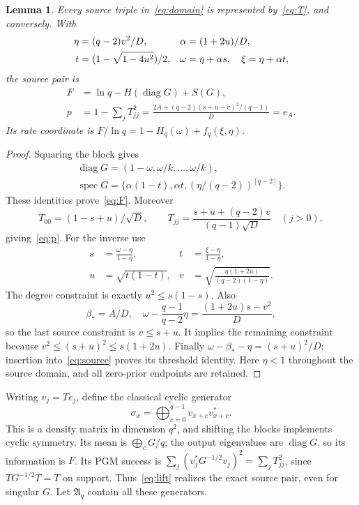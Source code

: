 \documentclass[12pt,letterpaper,onecolumn]{article}
\newtheorem{lemma}[theorem]{Lemma}
\theoremstyle{definition}
\theoremstyle{remark}
\DeclareMathOperator{\diag}{diag}
\DeclareMathOperator{\spec}{spec}
\begin{document}
\begin{lemma}\label{lem:source}
Every source triple in~\eqref{eq:domain} is represented by~\eqref{eq:T}, and conversely. With
\begin{align}
\eta&=(q-2)v^2/D,& \alpha&=(1+2u)/D,\notag\\
t&=(1-\sqrt{1-4u^2})/2,&
\omega&=\eta+\alpha s,\quad \xi=\eta+\alpha t,\label{eq:map}
\end{align}
the source pair is
\begin{align}
F&=\ln q-H(\diag G)+S(G),\label{eq:F}\\
p&=1-\sum_jT_{jj}^2
=\frac{2A+(q-2)(s+u-v)^2/(q-1)}D=e_A.\label{eq:p}
\end{align}
Its rate coordinate is \(F/\ln q=1-H_q(\omega)+f_q(\xi,\eta)\).
\end{lemma}
\begin{proof}
Squaring the block gives
\begin{gather*}
\diag G=(1-\omega,\omega/k,\ldots,\omega/k),\\
\spec G=\{\alpha(1-t),\alpha t,(\eta/(q-2))^{[q-2]}\}.
\end{gather*}
These identities prove~\eqref{eq:F}. Moreover
\[
T_{00}=(1-s+u)/\sqrt D,\qquad
T_{jj}=\frac{s+u+(q-2)v}{(q-1)\sqrt D}\quad(j>0),
\]
giving~\eqref{eq:p}. For the inverse use
\begin{align*}
s&=\frac{\omega-\eta}{1-\eta},&
t&=\frac{\xi-\eta}{1-\eta},\\
u&=\sqrt{t(1-t)},&
v&=\sqrt{\frac{\eta(1+2u)}{(q-2)(1-\eta)}}.
\end{align*}
The degree constraint is exactly \(u^2\le s(1-s)\).
Also
\[
\beta_*=A/D,\quad
\omega-\frac{q-1}{q-2}\eta=\frac{(1+2u)s-v^2}{D},
\]
so the last source constraint is \(v\le s+u\).
It implies the remaining constraint because
\(v^2\le(s+u)^2\le s(1+2u)\).
Finally \(\omega-\beta_*-\eta=(s+u)^2/D\); insertion into~\eqref{eq:source} proves its threshold identity. Here \(\eta<1\) throughout the source domain, and all zero-prior endpoints are retained.
\end{proof}

Writing \(v_j=Te_j\), define the classical cyclic generator
\begin{equation}\label{eq:lift}
\sigma_x=\bigoplus_{c=0}^{q-1}v_{x+c}v_{x+c}^*.
\end{equation}
This is a density matrix in dimension \(q^2\), and shifting the blocks implements cyclic symmetry. Its mean is \(\bigoplus_cG/q\); the output eigenvalues are \(\diag G\), so its information is \(F\). Its PGM success is
\(\sum_j(v_j^*G^{-1/2}v_j)^2=\sum_jT_{jj}^2\), since \(TG^{-1/2}T=T\) on support. Thus~\eqref{eq:lift} realizes the exact source pair, even for singular \(G\). Let \(\mathfrak A_q\) contain all these generators.
\end{document}
